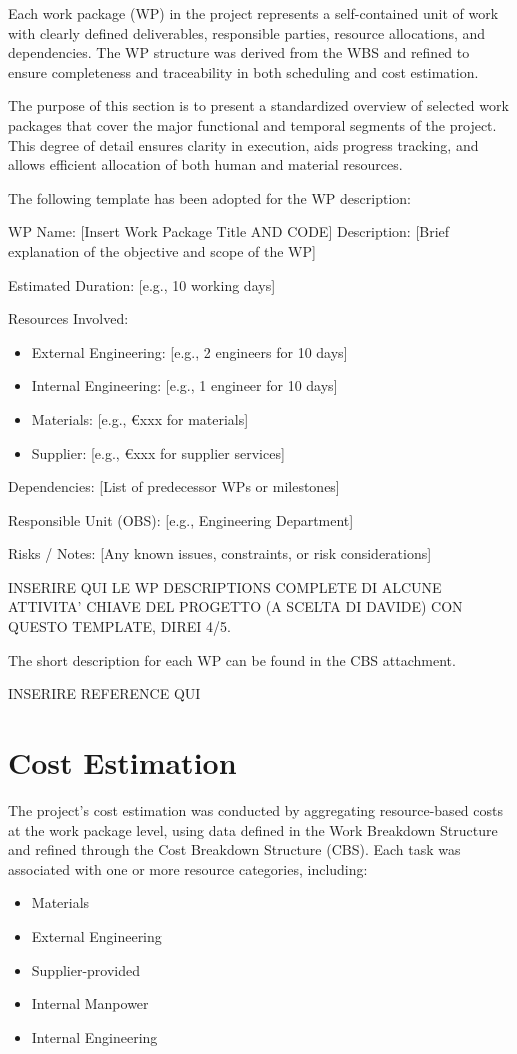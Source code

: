 \documentclass[12pt]{article}
\begin{document}
Each work package (WP) in the project represents a self-contained unit of work with clearly defined deliverables, responsible parties, resource allocations, and dependencies. The WP structure was derived from the WBS and refined to ensure completeness and traceability in both scheduling and cost estimation.

The purpose of this section is to present a standardized overview of selected work packages that cover the major functional and temporal segments of the project. This degree of detail ensures clarity in execution, aids progress tracking, and allows efficient allocation of both human and material resources.

The following template has been adopted for the WP description:

WP Name: [Insert Work Package Title AND CODE]
Description:
[Brief explanation of the objective and scope of the WP]

Estimated Duration: [e.g., 10 working days]

Resources Involved:
\begin{itemize}
        \item External Engineering: [e.g., 2 engineers for 10 days]
        \item Internal Engineering: [e.g., 1 engineer for 10 days]
        \item Materials: [e.g., €xxx for materials]
        \item Supplier: [e.g., €xxx for supplier services]
\end{itemize}

Dependencies:
[List of predecessor WPs or milestones]

Responsible Unit (OBS): [e.g., Engineering Department]

Risks / Notes:
[Any known issues, constraints, or risk considerations]

INSERIRE QUI LE WP DESCRIPTIONS COMPLETE DI ALCUNE ATTIVITA' CHIAVE DEL PROGETTO (A SCELTA DI DAVIDE) CON QUESTO TEMPLATE, DIREI 4/5.

The short description for each WP can be found in the CBS attachment.

INSERIRE REFERENCE QUI

\section{Cost Estimation}

The project’s cost estimation was conducted by aggregating resource-based costs at the work package level, using data defined in the Work Breakdown Structure and refined through the Cost Breakdown Structure (CBS). Each task was associated with one or more resource categories, including:
\begin{itemize}
        \item Materials
        \item External Engineering
        \item Supplier-provided
        \item Internal Manpower
        \item Internal Engineering
\end{itemize}
\end{document}
